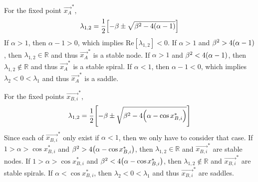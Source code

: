 \documentclass[12pt]{article}
\begin{document}
For the fixed point $\vec{x_A}^*$,
\begin{align*}
	\lambda_{1,2} = \frac{1}{2}\qty[-\beta \pm \sqrt{\beta^2 - 4\qty(\alpha - 1)}]
\end{align*}
If $\alpha > 1$, then $\alpha - 1 > 0$, which implies $\text{Re}[\lambda_{1,2}] < 0$.  If $\alpha > 1$ and $\beta^2 > 4\qty(\alpha - 1)$, then $\lambda_{1,2} \in \mathbb{R}$ and thus $\vec{x_A}^*$ is a stable node.  If $\alpha > 1$ and $\beta^2 < 4\qty(\alpha - 1)$, then $\lambda_{1,2} \not\in \mathbb{R}$ and thus $\vec{x_A}^*$ is a stable spiral.  If $\alpha < 1$, then $\alpha - 1 < 0$, which implies $\lambda_2 < 0 < \lambda_1$ and thus $\vec{x_A}^*$ is a saddle.

For the fixed points $\vec{x_{B,i}}^*$,
\begin{align*}
	\lambda_{1,2} = \frac{1}{2}\qty[-\beta \pm \sqrt{\beta^2 - 4\qty(\alpha - \cos x_{B,i}^*)}]
\end{align*}
Since each of $\vec{x_{B,i}}^*$ only exist if $\alpha < 1$, then we only have to consider that case.  If $1 > \alpha > \cos x_{B,i}^*$ and $\beta^2 > 4\qty(\alpha - \cos x_{B,i}^*)$, then $\lambda_{1,2} \in \mathbb{R}$ and $\vec{x_{B,i}}^*$ are stable nodes.  If $1 > \alpha > \cos x_{B,i}^*$ and $\beta^2 < 4\qty(\alpha - \cos x_{B,i}^*)$, then $\lambda_{1,2} \not\in \mathbb{R}$ and $\vec{x_{B,i}}^*$ are stable spirals.  If $\alpha < \cos x_{B,i}^*$, then $\lambda_2 < 0 < \lambda_1$ and thus $\vec{x_{B,i}}^*$ are saddles. \\
\end{document}

